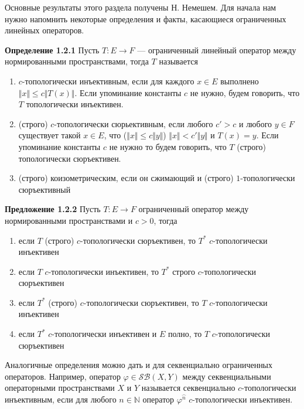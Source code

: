 \documentclass[12pt]{article}
\begin{document}
Основные результаты этого раздела получены Н. Немешем. Для начала нам нужно
напомнить некоторые определения и факты, касающиеся ограниченных линейных
операторов.

{\bf Определение 1.2.1}\label{DefNorOpType} Пусть $ T:E\to F$ --- ограниченный
линейный оператор между нормированными пространствами, тогда $ T$ называется
\begin{enumerate}[label = (\roman*)]
    \item $c$-топологически инъективным, если для каждого $x \in E$ выполнено
    $\Vert x\Vert\leq c\Vert  T(x)\Vert$. Если упоминание константы $c$ не
    нужно, будем говорить, что $ T$ топологически инъективен.

    \item (строго) $c$-топологически сюрьективным, если любого $c'>c$ и любого
    $y\in F$ существует такой $x \in E$, что ($\Vert x \Vert \leq c \Vert y
    \Vert$) $\Vert x \Vert < c' \Vert y \Vert$ и $ T(x) = y$. Если упоминание
    константы $c$ не нужно то будем говорить, что $ T$ (строго) топологически
    сюръективен.

    \item (строго) коизометрическим, если он сжимающий и (строго)
    $1$-топологически сюръективный
\end{enumerate}

\medskip

{\bf Предложение 1.2.2}\label{PrDualOps} Пусть $ T:E\to F$ ограниченный оператор
между нормированными пространствами и $c>0$, тогда
\begin{enumerate}[label = (\roman*)]
    \item если $ T$ (строго) $c$-топологически сюръективен, то $ T^*$
    $c$-топологически инъективен

    \item если $ T$ $c$-топологически инъективен, то $ T^*$ строго
    $c$-топологически сюръективен

    \item если $ T^*$ (строго) $c$-топологически сюръективен, то $ T$
    $c$-топологически инъективен

    \item если $ T^*$ $c$-топологически инъективен и $E$ полно, то $ T$
    $c$-топологически сюръективен
\end{enumerate}

\medskip

Аналогичные определения можно дать и для секвенциально ограниченных операторов.
Например, оператор $\varphi\in\mathcal{SB}(X,Y)$ между секвенциальными
операторными пространствами $X$ и $Y$ называется секвенциально $c$-топологически
инъективным, если для любого $n\in\mathbb{N}$ оператор $\varphi^{\wideparen{n}}$
$c$-топологически инъективен.
\end{document}
